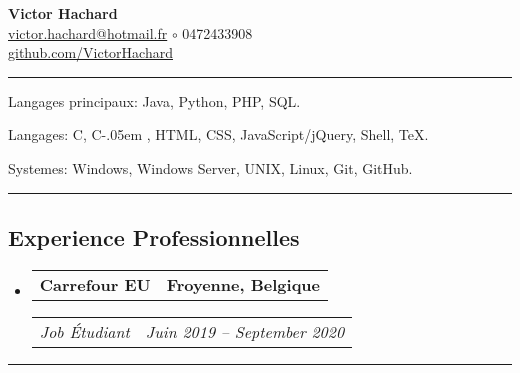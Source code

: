 \documentclass[10pt,letterpaper]{article}
\makeatletter
\newcommand{\Csharp}{%
  {\settoheight{\dimen0}{C}C\kern-.05em \resizebox{!}{\dimen0}{\raisebox{\depth}{\#}}}}
\newenvironment{indentsection}[1]
{\begin{list}{}
  {\setlength{\leftmargin}{#1}} \item[]
}
{\end{list}}
\newcommand{\headerrow}[2]
{\begin{tabular*}{\linewidth}{l@{\extracolsep{\fill}}r}
  #1 &
  #2 \\
\end{tabular*}}
\makeatother
\begin{document}
\begin{center}
  \huge \textbf{Victor Hachard} \\
  \large
  \href{mailto:victor.hachard@hotmail.fr}{victor.hachard@hotmail.fr}
  $\circ$
  0472433908
  \\
  \href{http://www.github.com/VictorHachard}{github.com/VictorHachard}
  \vspace{-0.2em}
\end{center}


\hrule
\begin{indentsection}{\parindent}
\begin{description*}
  \item[Langages principaux:] Java, Python, PHP, SQL.
  \item[Langages:] C, \Csharp, HTML, CSS, JavaScript/jQuery, Shell, TeX.
  \item[Systemes:] Windows, Windows Server, UNIX, Linux, Git, GitHub.
\end{description*}
\end{indentsection}


\hrule
\vspace{-0.4em}
\subsection*{Experience Professionnelles}
\begin{itemize}
  \parskip=0.1em

  \item
  \headerrow
    {\textbf{Carrefour EU}}
    {\textbf{Froyenne, Belgique}}
  \headerrow
    {\emph{Job Étudiant}}
    {\emph{Juin 2019 -- September 2020}}
  \end{itemize}


\hrule
\vspace{-0.4em}
\end{document}
